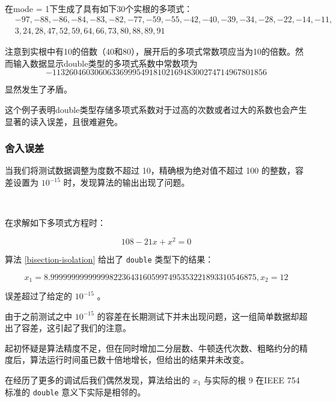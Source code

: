 	\begin{example}[读入误差2]~
		
		在mode = 1下生成了具有如下30个实根的多项式：
		$$
		\begin{aligned}
		& -97,-88,-86,-84,-83,-82,-77,-59,-55,-42,-40,-39,-34,-28,-22,-14,-11, \\
		& 3,24,28,47,52,59,64,66,73,80,88,89,91
		\end{aligned}
		$$
		
		注意到实根中有10的倍数（40和80），展开后的多项式常数项应当为10的倍数。然而输入数据显示double类型的多项式系数中常数项为
		$$
		-113260460306063369995491810216948300274714967801856
		$$ 
		
		显然发生了矛盾。
	
	\end{example}

	这个例子表明double类型存储多项式系数对于过高的次数或者过大的系数也会产生显著的读入误差，且很难避免。

    
    \subsubsection*{舍入误差}

    当我们将测试数据调整为度数不超过 10，精确根为绝对值不超过 100 的整数，容差设置为 $10^{-15}$ 时，发现算法的输出出现了问题。

    \begin{example}[舍入误差]~

        在求解如下多项式方程时：

        \[ 108 -21x +x^2 = 0 \]
        
        算法 \ref{bisection-isolation} 给出了 \verb|double| 类型下的结果：

        \[ x_1 = 8.9999999999999982236431605997495353221893310546875, x_2 = 12\]
        
        误差超过了给定的 $10^{-15}$ 。
        
    \end{example}

	由于之前测试之中 $10^{-15}$ 的容差在长期测试下并未出现问题，这一组简单数据却超出了容差，这引起了我们的注意。
	
	起初怀疑是算法精度不足，但在同时增加二分层数、牛顿迭代次数、粗略约分的精度后，算法运行时间虽已数十倍地增长，但给出的结果并未改变。
	
	在经历了更多的调试后我们偶然发现，算法给出的 $x_1$ 与实际的根 $9$ 在IEEE 754标准的 \verb|double| 意义下实际是相邻的。
	
